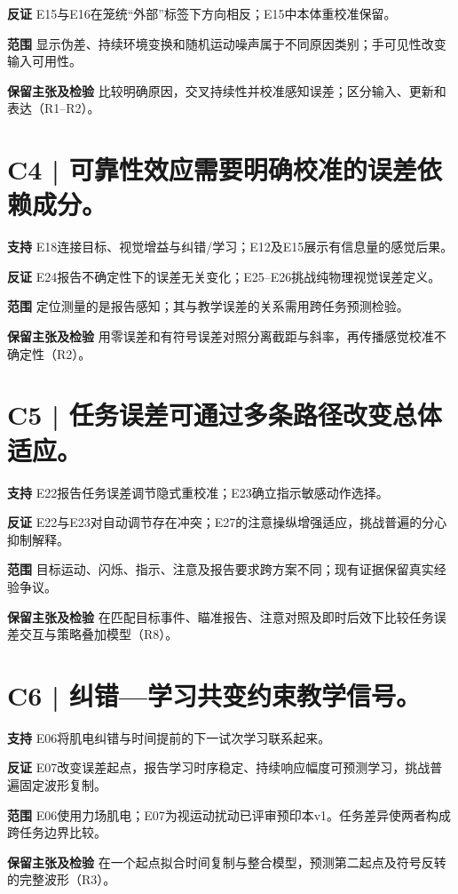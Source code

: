 \documentclass[11pt,a4paper]{article}
\begin{document}
\textbf{反证} E15与E16在笼统“外部”标签下方向相反；E15中本体重校准保留。\par
\textbf{范围} 显示伪差、持续环境变换和随机运动噪声属于不同原因类别；手可见性改变输入可用性。\par
\textbf{保留主张及检验} 比较明确原因，交叉持续性并校准感知误差；区分输入、更新和表达（R1--R2）。\par
\medskip\section{C4 | 可靠性效应需要明确校准的误差依赖成分。}
\textbf{支持} E18连接目标、视觉增益与纠错/学习；E12及E15展示有信息量的感觉后果。\par
\textbf{反证} E24报告不确定性下的误差无关变化；E25--E26挑战纯物理视觉误差定义。\par
\textbf{范围} 定位测量的是报告感知；其与教学误差的关系需用跨任务预测检验。\par
\textbf{保留主张及检验} 用零误差和有符号误差对照分离截距与斜率，再传播感觉校准不确定性（R2）。\par
\clearpage\section{C5 | 任务误差可通过多条路径改变总体适应。}
\textbf{支持} E22报告任务误差调节隐式重校准；E23确立指示敏感动作选择。\par
\textbf{反证} E22与E23对自动调节存在冲突；E27的注意操纵增强适应，挑战普遍的分心抑制解释。\par
\textbf{范围} 目标运动、闪烁、指示、注意及报告要求跨方案不同；现有证据保留真实经验争议。\par
\textbf{保留主张及检验} 在匹配目标事件、瞄准报告、注意对照及即时后效下比较任务误差交互与策略叠加模型（R8）。\par
\medskip\section{C6 | 纠错—学习共变约束教学信号。}
\textbf{支持} E06将肌电纠错与时间提前的下一试次学习联系起来。\par
\textbf{反证} E07改变误差起点，报告学习时序稳定、持续响应幅度可预测学习，挑战普遍固定波形复制。\par
\textbf{范围} E06使用力场肌电；E07为视运动扰动已评审预印本v1。任务差异使两者构成跨任务边界比较。\par
\textbf{保留主张及检验} 在一个起点拟合时间复制与整合模型，预测第二起点及符号反转的完整波形（R3）。\par
\end{document}
